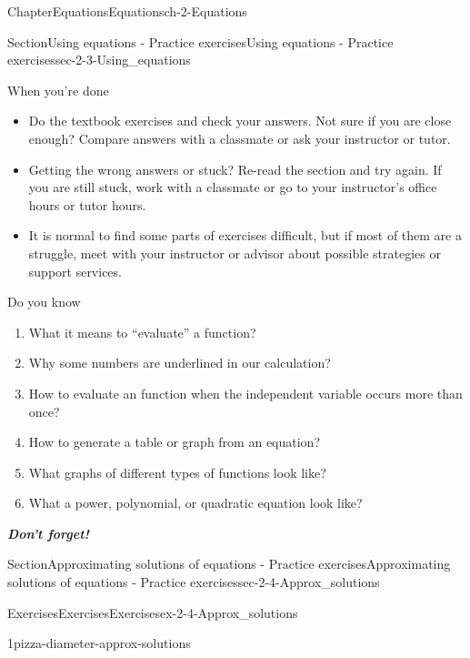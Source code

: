 \documentclass[twoside,11pt,]{book}
\newcommand{\alert}[1]{\textbf{\textit{#1}}}
\numberwithin{equation}{section}
\begin{document}
\begin{chapterptx}{Chapter}{Equations}{}{Equations}{}{}{ch-2-Equations}
\begin{sectionptx}{Section}{Using equations - Practice exercises}{}{Using equations - Practice exercises}{}{}{sec-2-3-Using_equations}
\begin{conclusion}{When you're done \textellipsis{}}
\begin{itemize}[label=\textbullet]
\item{}Do the textbook exercises and check your answers. Not sure if you are close enough? Compare answers with a classmate or ask your instructor or tutor.%
\item{}Getting the wrong answers or stuck? Re-read the section and try again. If you are still stuck, work with a classmate or go to your instructor's office hours or tutor hours.%
\item{}It is normal to find some parts of exercises difficult, but if most of them are a struggle, meet with your instructor or advisor about possible strategies or support services.%
\end{itemize}
%
\end{conclusion}%
\begin{conclusion}{Do you know \textellipsis{}}%
%
\begin{enumerate}[label={\Alph*.}]
\item{}What it means to ``evaluate'' a function?%
\item{}Why some numbers are underlined in our calculation?%
\item{}How to evaluate an function when the independent variable occurs more than once?%
\item{}How to generate a table or graph from an equation?%
\item{}What graphs of different types of functions look like?%
\item{}What a power, polynomial, or quadratic equation look like?%
\end{enumerate}
%
\par
\alert{Don't forget!}%
\end{conclusion}%
\end{sectionptx}
%
%
\typeout{************************************************}
\typeout{************************************************}
%
\begin{sectionptx}{Section}{Approximating solutions of equations - Practice exercises}{}{Approximating solutions of equations - Practice exercises}{}{}{sec-2-4-Approx_solutions}
%
%
\typeout{************************************************}
\typeout{************************************************}
%
\begin{exercises-subsection-numberless}{Exercises}{Exercises}{}{Exercises}{}{}{ex-2-4-Approx_solutions}
\begin{divisionexercise}{1}{}{}{pizza-diameter-approx-solutions}%

\end{divisionexercise}
\end{exercises-subsection-numberless}
\end{sectionptx}
\end{chapterptx}
\end{document}

